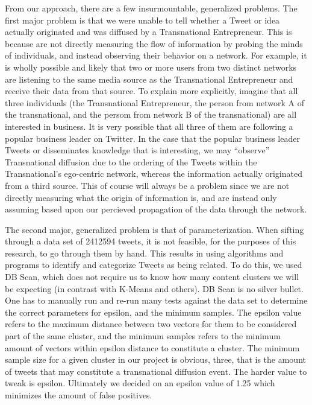 From our approach, there are a few insurmountable, generalized
problems. The first major problem is that we were unable to tell
whether a Tweet or idea actually originated and was diffused by a
Transnational Entrepreneur. This is because are not directly measuring
the flow of information by probing the minds of individuals, and
instead observing their behavior on a network. For example, it is
wholly possible and likely that two or more users from two distinct
networks are listening to the same media source as the Transnational
Entrepreneur and receive their data from that source. To explain more
explicitly, imagine that all three individuals (the Transnational
Entrepreneur, the person from network A of the transnational, and the
persom from network B of the transnational) are all interested in
business. It is very possible that all three of them are following a
popular business leader on Twitter. In the case that the popular
business leader Tweets or disseminates knowledge that is interesting,
we may ``observe'' Transnational diffusion due to the ordering of the
Tweets within the Transnational's ego-centric network, whereas the
information actually originated from a third source. This of course
will always be a problem since we are not directly measuring what the
origin of information is, and are instead only assuming based upon our
percieved propagation of the data through the network.

The second major, generalized problem is that of parameterization.
When sifting through a data set of 2412594 tweets, it is not feasible,
for the purposes of this research, to go through them by hand. This
results in using algorithms and programs to identify and categorize
Tweets as being related. To do this, we used DB Scan, which does not
require us to know how many content clusters we will be expecting (in
contrast with K-Means and others). DB Scan is no silver bullet. One
has to manually run and re-run many tests against the data set to
determine the correct parameters for epsilon, and the minimum
samples. The epsilon value refers to the maximum distance between two
vectors for them to be considered part of the same cluster, and the
minimum samples refers to the minimum amount of vectors within epsilon
distance to constitute a cluster. The minimum sample size for a given
cluster in our project is obvious, three, that is the amount of tweets
that may constitute a transnational diffusion event. The harder value
to tweak is epsilon. Ultimately we decided on an epsilon value of 1.25
which minimizes the amount of false positives.

